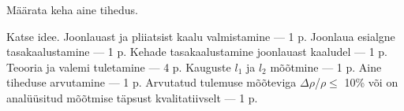 
Määrata keha aine tihedus.

\hint

\solu
Katse idee. Joonlauast ja pliiatsist kaalu valmistamine --- 1 p. Joonlaua esialgne tasakaalustamine --- 1 p. Kehade tasakaalustamine joonlauast kaaludel --- 1 p. Teooria ja valemi tuletamine --- 4 p. Kauguste $l_1$ ja $l_2$ mõõtmine --- 1 p. Aine tiheduse arvutamine --- 1 p. Arvutatud tulemuse mõõteviga $\Delta\rho$/$\rho \leq$ 10\% või on analüüsitud mõõtmise täpsust kvalitatiivselt --- 1 p.
\probend
